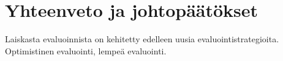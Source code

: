 \section{Yhteenveto ja johtopäätökset}

Laiskasta evaluoinnista on kehitetty edelleen uusia evaluointistrategioita. Optimistinen evaluointi, lempeä evaluointi. \citep{ennals2003optimistic} \citep{maessen2002hybrid}

